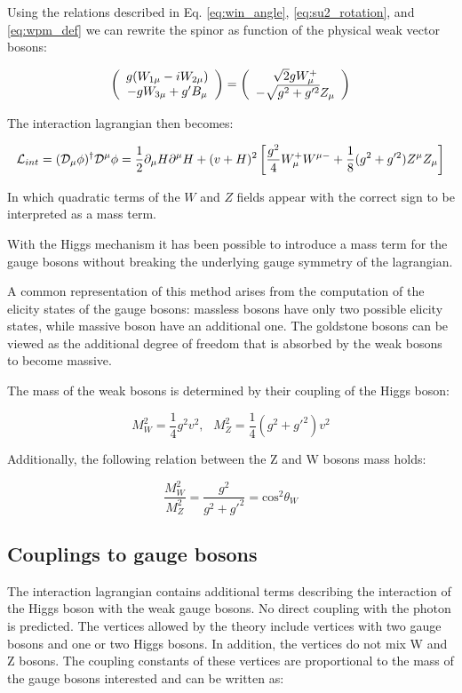 Using the relations described in Eq. \ref{eq:win_angle}, \ref{eq:su2_rotation}, and \ref{eq:wpm_def} we can rewrite the spinor as function of the physical weak vector bosons:

\begin{equation}
\left(\begin{array}{c}g(W_{1\mu} - i W_{2\mu}) \\-g W_{3\mu} + g'B_\mu\end{array}\right) = \left(\begin{array}{c}\sqrt{2} g W^+_{\mu} \\-\sqrt{g^2+g'^2}Z_\mu\end{array}\right)
\end{equation}

The interaction lagrangian then becomes:

\begin{equation}
\mathcal{L}_{int} = (\mathcal{D}_\mu\phi)^\dagger\mathcal{D}^\mu\phi = \frac{1}{2}\partial_{\mu}H\partial^{\mu}H+(v+H)^2\left[\frac{g^2}{4}W^+_{\mu}W^{\mu-} + \frac{1}{8}(g^2+g'^2) Z^{\mu}Z_{\mu}\right ]
\end{equation}

In which quadratic terms of the $W$ and $Z$ fields appear with the correct sign to be interpreted as a mass term. 

With the Higgs mechanism it has been possible to introduce a mass term for the gauge bosons without breaking the underlying gauge symmetry of the lagrangian. 

A common representation of this method arises from the computation of the elicity states of the gauge bosons: massless bosons have only two possible elicity states, while massive boson have an additional one. The goldstone bosons can be viewed as the additional degree of freedom that is absorbed by the weak bosons to become massive.

The mass of the weak bosons is determined by their coupling of the Higgs boson: 

\begin{equation}
M^2_W=\frac{1}{4}g^2v^2, \, \, \, \, M^2_Z=\frac{1}{4}(g^2+g'^2)v^2
\end{equation}

Additionally, the following relation between the Z and W bosons mass holds:

\begin{equation}
\frac{M_W^2}{M_Z^2}=\frac{g^2}{g^2+g'^2}=\operatorname{cos^2}\theta_W
\end{equation}

\subsection{Couplings to gauge bosons}

The interaction lagrangian contains additional terms describing the interaction of the Higgs boson with the weak gauge bosons. No direct coupling with the photon is predicted. The vertices allowed by the theory include vertices with two gauge bosons and one or two Higgs bosons. In addition, the vertices do not mix W and Z bosons. The coupling constants of these vertices are proportional to the mass of the gauge bosons interested and can be written as:

